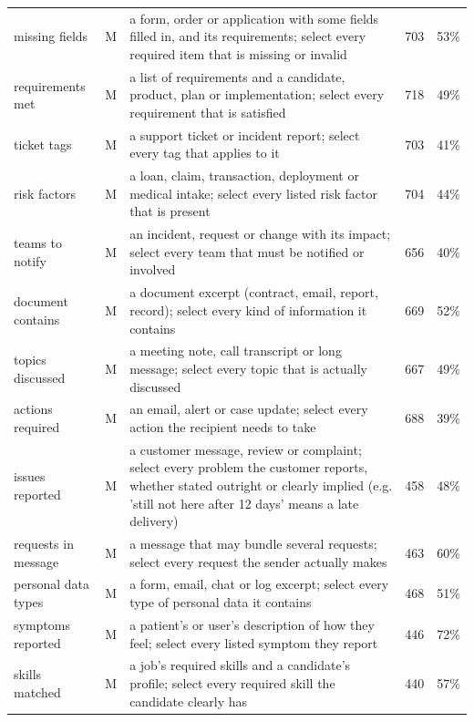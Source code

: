 \begin{longtable}{@{}lc>{\raggedright\arraybackslash}p{8.4cm}rr@{}}
missing fields & M & a form, order or application with some fields filled in, and its requirements; select every required item that is missing or invalid & 703 & 53\% \\
requirements met & M & a list of requirements and a candidate, product, plan or implementation; select every requirement that is satisfied & 718 & 49\% \\
ticket tags & M & a support ticket or incident report; select every tag that applies to it & 703 & 41\% \\
risk factors & M & a loan, claim, transaction, deployment or medical intake; select every listed risk factor that is present & 704 & 44\% \\
teams to notify & M & an incident, request or change with its impact; select every team that must be notified or involved & 656 & 40\% \\
document contains & M & a document excerpt (contract, email, report, record); select every kind of information it contains & 669 & 52\% \\
topics discussed & M & a meeting note, call transcript or long message; select every topic that is actually discussed & 667 & 49\% \\
actions required & M & an email, alert or case update; select every action the recipient needs to take & 688 & 39\% \\
issues reported & M & a customer message, review or complaint; select every problem the customer reports, whether stated outright or clearly implied (e.g. 'still not here after 12 days' means a late delivery) & 458 & 48\% \\
requests in message & M & a message that may bundle several requests; select every request the sender actually makes & 463 & 60\% \\
personal data types & M & a form, email, chat or log excerpt; select every type of personal data it contains & 468 & 51\% \\
symptoms reported & M & a patient's or user's description of how they feel; select every listed symptom they report & 446 & 72\% \\
skills matched & M & a job's required skills and a candidate's profile; select every required skill the candidate clearly has & 440 & 57\% \\
\end{longtable}
